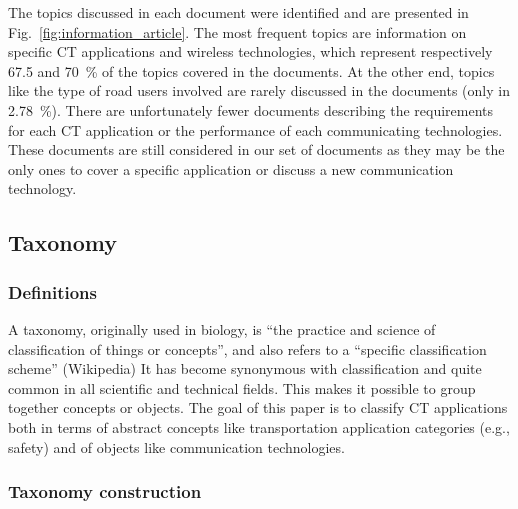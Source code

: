 The topics discussed in each document were identified and are presented in Fig.~\ref{fig:information_article}. The most frequent topics are information on specific \acrshort{CT} applications and wireless technologies, which represent respectively 67.5 and 70~\% of the topics covered in the documents. At the other end, topics like the type of road users involved are rarely discussed in the documents (only in 2.78~\%). 
There are unfortunately fewer documents describing the requirements for each \acrshort{CT} application or the performance of each communicating technologies. These documents are still considered in our set of documents as they may be the only ones to cover a specific application or discuss a new communication technology. 

\subsection{Taxonomy}
\subsubsection{Definitions}

A taxonomy, originally used in biology, is ``the practice and science of classification of things or concepts'', and also refers to a ``specific classification scheme'' (Wikipedia) \cite{wikipedia_taxonomy_2021}
It has become synonymous with classification and quite common in all scientific and technical fields. This makes it possible to group together concepts or objects. The goal of this paper is to classify \acrshort{CT} applications both in terms of abstract concepts like transportation application categories (e.g., safety) and of objects like communication technologies. 

\subsubsection{Taxonomy construction}

